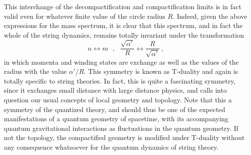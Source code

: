 \documentclass[a4paper,11pt]{article}
\begin{document}
This interchange of the decompactification and compactification limits
is in fact valid even for whatever finite value of the circle radius $R$.
Indeed, given the above expressions for the mass spectrum, it is clear that
this spectrum, and in fact the whole of the string dynamics, remains totally
invariant under the transformation
\begin{equation}
n\leftrightarrow m\ \ \ ,\ \ \ 
\frac{\sqrt{\alpha'}}{R}\leftrightarrow\frac{R}{\sqrt{\alpha'}}\ ,
\end{equation}
in which momenta and winding states are exchange as well as the values
of the radius with the value $\alpha'/R$. This symmetry is known as
T-duality and again is totally specific to string theories.\cite{Tdual} 
In fact, this is quite a fascinating symmetry, since it exchanges small 
distance with large distance physics, and calls into question our usual 
concepts of local geometry and topology. Note that this a symmetry of the 
quantized theory, and should thus be one of the expected manifestations of a
quantum geometry of spacetime, with its accompanying quantum gravitational
interactions as fluctuations in the quantum geometry. If not the topology,
the compactified geometry is modified under T-duality without any consequence
whatsoever for the quantum dynamics of string theory.
\end{document}
